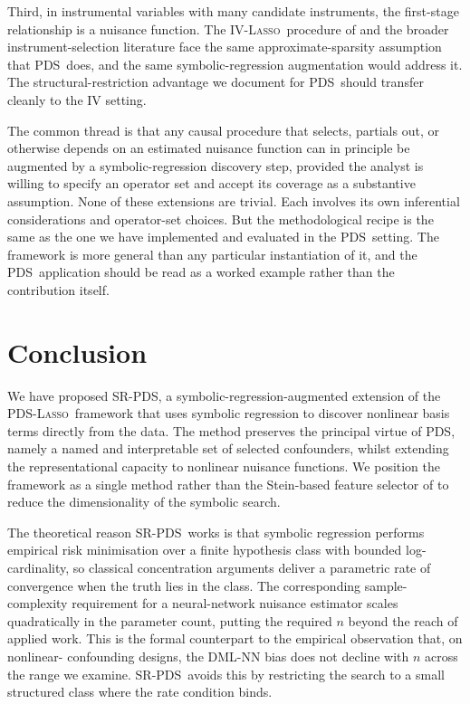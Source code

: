 \documentclass[11pt, a4paper]{article}
\theoremstyle{plain}
\theoremstyle{definition}
\theoremstyle{remark}
\newcommand{\lasso}{\textsc{Lasso}}
\newcommand{\pds}{\textsc{PDS}}
\newcommand{\dml}{\textsc{DML}}
\newcommand{\epds}{\textsc{SR-PDS}}
\begin{document}
Third, in instrumental variables with many candidate
instruments, the first-stage relationship is a nuisance
function. The IV-\lasso\ procedure of \citet{bch2014} and the
broader instrument-selection literature face the same
approximate-sparsity assumption that \pds\ does, and the same
symbolic-regression augmentation would address it. The
structural-restriction advantage we document for \pds\ should
transfer cleanly to the IV setting.

The common thread is that any causal procedure that selects,
partials out, or otherwise depends on an estimated nuisance
function can in principle be augmented by a symbolic-regression
discovery step, provided the analyst is willing to specify an
operator set and accept its coverage as a substantive
assumption. None of these extensions are trivial. Each involves
its own inferential considerations and operator-set choices.
But the methodological recipe is the same as the one we have
implemented and evaluated in the \pds\ setting. The framework
is more general than any particular instantiation of it, and
the \pds\ application should be read as a worked example rather
than the contribution itself.

\section{Conclusion}
\label{sec:conclusion}

We have proposed \epds, a symbolic-regression-augmented
extension of
the \citet{bch2014} \pds-\lasso\ framework that uses symbolic
regression to discover nonlinear basis terms directly from the
data. The method preserves the principal virtue of \pds, namely
a named and interpretable set of selected confounders, whilst
extending the representational capacity to nonlinear nuisance
functions. We position the framework as a single method rather than
the Stein-based feature selector of \citet{duetal2025} to reduce
the dimensionality of the symbolic search.

The theoretical reason \epds\ works is that symbolic regression
performs empirical risk minimisation over a finite hypothesis
class with bounded log-cardinality, so classical concentration
arguments deliver a parametric rate of convergence when the
truth lies in the class. The corresponding sample-complexity
requirement for a neural-network nuisance estimator scales
quadratically in the parameter count, putting the required $n$
beyond the reach of applied work. This is the formal
counterpart to the empirical observation that, on nonlinear-%
confounding designs, the \dml-NN bias does not decline with $n$
across the range we examine. \epds\ avoids this by restricting
the search to a small structured class where the rate condition
binds.
\end{document}
